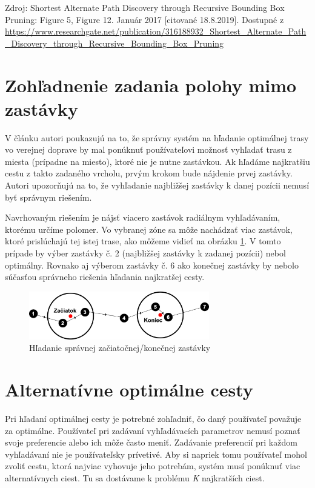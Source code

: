 \begin{footnotesize}
Zdroj: Shortest Alternate Path Discovery through Recursive Bounding Box Pruning: Figure 5, Figure 12. Január 2017 [citované 18.8.2019]. Dostupné z \url{https://www.researchgate.net/publication/316188932_Shortest_Alternate_Path_Discovery_through_Recursive_Bounding_Box_Pruning}
\end{footnotesize}

\section{Zohľadnenie zadania polohy mimo zastávky}
\label{sec:actual-location}
V článku \cite{circular} autori poukazujú na to, že správny systém na hľadanie optimálnej trasy vo verejnej doprave by mal ponúknuť používateľovi možnosť vyhľadať trasu z miesta (prípadne na miesto), ktoré nie je nutne zastávkou. Ak hľadáme najkratšiu cestu z takto zadaného vrcholu, prvým krokom bude nájdenie prvej zastávky. Autori upozorňujú na to, že vyhľadanie najbližšej zastávky k danej pozícii nemusí byť správnym riešením.

Navrhovaným riešením je nájsť viacero zastávok radiálnym vyhľadávaním, ktorému určíme polomer. Vo vybranej zóne sa môže nachádzať viac zastávok, ktoré prislúchajú tej istej trase, ako môžeme vidieť na obrázku \ref{fig:circularRoute}. V tomto prípade by výber zastávky č. 2 (najbližšej zastávky k zadanej pozícii) nebol optimálny. Rovnako aj výberom zastávky č. 6 ako konečnej zastávky by nebolo súčasťou správneho riešenia hľadania najkratšej cesty. 

\begin{figure}[H]
\centerline{\includegraphics[width=0.7\textwidth]{images/circular-route}}
\caption[Hľadanie správnej začiatočnej/konečnej zastávky]{Hľadanie správnej začiatočnej/konečnej zastávky}
\label{fig:circularRoute}
\end{figure}

\section{Alternatívne optimálne cesty}
Pri hľadaní optimálnej cesty je potrebné zohľadniť, čo daný používateľ považuje za optimálne. Používateľ pri zadávaní vyhľadávacích parametrov nemusí poznať svoje preferencie alebo ich môže často meniť. Zadávanie preferencií pri každom vyhľadávaní nie je používateľsky prívetivé. Aby si napriek tomu používateľ mohol zvoliť cestu, ktorá najviac vyhovuje jeho potrebám, systém musí ponúknuť viac alternatívnych ciest. Tu sa dostávame k problému \textit{K} najkratších ciest.


